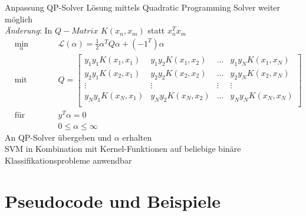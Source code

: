 \documentclass[ngerman]{beamer}
\newcommand{\Lagr}{\mathcal{L}}
\begin{document}
\begin{frame}{Anpassung QP-Solver}
    Lösung mittels Quadratic Programming Solver weiter möglich \\
    \emph{Änderung}: In $Q-Matrix$ $K(x_{n}, x_{m})$ statt $x_{n}^{T}x_{m}$ \\ \pause
    \begin{subequations} \label{subeq:q1_pres}
    \begin{alignat*}{2}
        &\!\min_{\alpha}        &\qquad& \Lagr(\alpha) = \frac{1}{2} \alpha^{T} Q \alpha + (-1^T) \alpha \label{eq:qp1_pres}\\
        &\text{mit} &      & Q = \begin{bmatrix}
                                     y_{1}y_{1} K(x_{1}, x_{1}) & y_{1}y_{2} K(x_{1}, x_{2}) & \dots & y_{1}y_{N} K(x_{1}, x_{N})\\
                                     y_{2}y_{1} K(x_{2}, x_{1}) & y_{2}y_{2} K(x_{2}, x_{2}) & \dots & y_{2}y_{N} K(x_{2}, x_{N})\\
                                     \vdots & \vdots & \vdots & \vdots\\
                                     y_{N}y_{1} K(x_{N}, x_{1}) & y_{N}y_{2} K(x_{N}, x_{2}) & \dots & y_{N}y_{N} K(x_{N}, x_{N})\\
        \end{bmatrix}\\
        &\text{für} & & y^{T} \alpha = 0\\
        & & & 0 \leq \alpha \leq \infty
    \end{alignat*}
    \end{subequations} \pause
    An QP-Solver übergeben und $\alpha$ erhalten \\ \pause
    SVM in Kombination mit Kernel-Funktionen auf beliebige binäre Klassifikationsprobleme anwendbar
\end{frame}

\section{Pseudocode und Beispiele}\label{sec:pseudobsopres}
\end{document}
